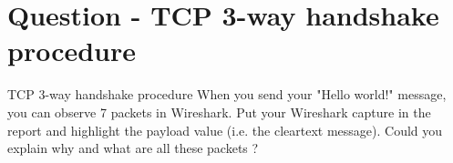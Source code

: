 \section{Question - TCP 3-way handshake procedure}

\begin{questionBox}{TCP 3-way handshake procedure}
    When you send your "Hello world!" message, you can observe 7 packets in Wireshark. Put your Wireshark capture in the report and highlight the payload value (i.e. the cleartext message). Could you explain why and what are all these packets ?
\end{questionBox}
